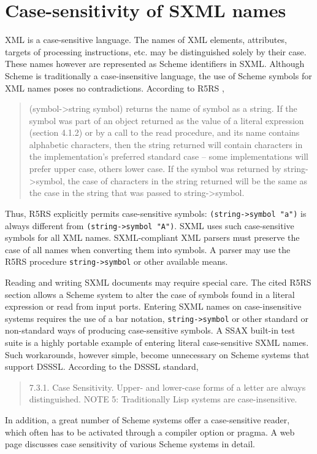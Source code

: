 \documentclass[10pt]{article}
\begin{document}
\section{Case-sensitivity of SXML names}
XML is a case-sensitive language. The names of XML elements,
attributes, targets of processing instructions, etc. may be
distinguished solely by their case. These names however are
represented as Scheme identifiers in SXML. Although Scheme is
traditionally a case-insensitive language, the use of Scheme symbols
for XML names poses no contradictions. According to R5RS \cite{R5RS}, \begin{quote}
(symbol->string symbol) returns the name of symbol as a string. If
the symbol was part of an object returned as the value of a literal
expression (section 4.1.2) or by a call to the read procedure, and its
name contains alphabetic characters, then the string returned will
contain characters in the implementation's preferred standard
case -- some implementations will prefer upper case, others lower
case. If the symbol was returned by string->symbol, the case of
characters in the string returned will be the same as the case in the
string that was passed to string->symbol.\end{quote}


Thus, R5RS explicitly permits case-sensitive symbols: \texttt{(string->symbol "a")} is always different from \texttt{(string->symbol "A")}. SXML uses such case-sensitive symbols for
all XML names. SXML-compliant XML parsers must preserve the case of
all names when converting them into symbols. A parser may use the R5RS
procedure \texttt{string->symbol} or other available means.

Reading and writing SXML documents may require special care. The cited R5RS section allows a Scheme system to alter the case of symbols found in a literal expression or read from input ports. Entering SXML names on case-insensitive systems requires the use of a bar notation, \texttt{string->symbol} or
other standard or non-standard ways of producing case-sensitive
symbols. A SSAX built-in test suite is a highly portable example of entering literal case-sensitive SXML names. Such workarounds, however simple, become unnecessary on Scheme systems that support DSSSL. According to the DSSSL standard,\begin{quote}
7.3.1. Case Sensitivity. Upper- and lower-case forms of a
letter are always distinguished. NOTE 5: Traditionally Lisp systems
are case-insensitive.\end{quote}
In addition, a great number of Scheme systems offer a
case-sensitive reader, which often has to be activated through a
compiler option or pragma. A web page \cite{Scheme-case-sensitivity} discusses case sensitivity of various Scheme systems in detail.
\end{document}
